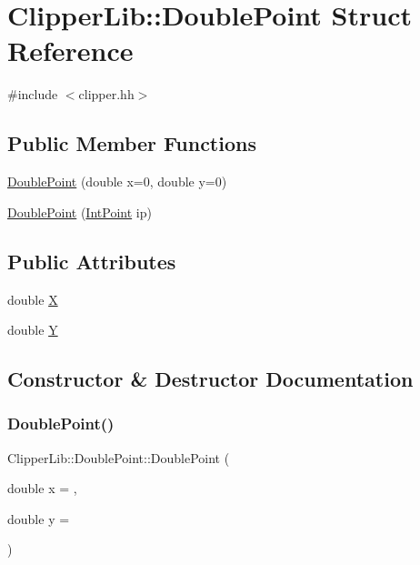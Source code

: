 \hypertarget{struct_clipper_lib_1_1_double_point}{}\section{Clipper\+Lib\+::Double\+Point Struct Reference}
\label{struct_clipper_lib_1_1_double_point}


{\ttfamily \#include $<$clipper.\+hh$>$}

\subsection*{Public Member Functions}
\begin{DoxyCompactItemize}
\item 
\mbox{\hyperlink{struct_clipper_lib_1_1_double_point_a3ccbea6aaf488e0a2d8ac499d2676093}{Double\+Point}} (double x=0, double y=0)
\item 
\mbox{\hyperlink{struct_clipper_lib_1_1_double_point_afd33c9193b3cf11536936dc933b965a4}{Double\+Point}} (\mbox{\hyperlink{struct_clipper_lib_1_1_int_point}{Int\+Point}} ip)
\end{DoxyCompactItemize}
\subsection*{Public Attributes}
\begin{DoxyCompactItemize}
\item 
double \mbox{\hyperlink{struct_clipper_lib_1_1_double_point_a675837cc05f20447313789b82d84ad31}{X}}
\item 
double \mbox{\hyperlink{struct_clipper_lib_1_1_double_point_a49774a93540882d88448badf37034454}{Y}}
\end{DoxyCompactItemize}


\subsection{Constructor \& Destructor Documentation}
\mbox{\label{struct_clipper_lib_1_1_double_point_a3ccbea6aaf488e0a2d8ac499d2676093}} 
\subsubsection{\texorpdfstring{DoublePoint()}{DoublePoint()}\hspace{0.1cm}{\footnotesize\ttfamily [1/2]}}
{\footnotesize\ttfamily Clipper\+Lib\+::\+Double\+Point\+::\+Double\+Point (\begin{DoxyParamCaption}\item[{double}]{x = {},  }\item[{double}]{y = {} }\end{DoxyParamCaption})\hspace{0.3cm}{\ttfamily [inline]}}

